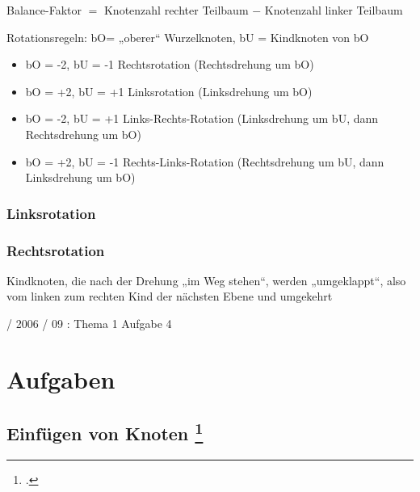 \documentclass{lehramt-informatik-haupt}
\begin{document}
\begin{center}
Balance-Faktor $=$ Knotenzahl rechter Teilbaum $-$ Knotenzahl linker Teilbaum
\end{center}

Rotationsregeln:
bO= „oberer“ Wurzelknoten, bU = Kindknoten von bO

\begin{itemize}
\item bO = -2, bU = -1  Rechtsrotation (Rechtsdrehung um bO)
\item bO = +2, bU = +1  Linksrotation (Linksdrehung um bO)
\item bO = -2, bU = +1  Links-Rechts-Rotation (Linksdrehung um bU, dann Rechtsdrehung um bO)
\item bO = +2, bU = -1  Rechts-Links-Rotation (Rechtsdrehung um bU, dann Linksdrehung um bO)
\end{itemize}

%

\subsection{Linksrotation}


%

\subsection{Rechtsrotation}


Kindknoten, die nach der Drehung „im Weg stehen“, werden „umgeklappt“,
also vom linken zum rechten Kind der nächsten Ebene und umgekehrt

 / 2006 / 09 : Thema 1 Aufgabe 4


\chapter{Aufgaben}

\section{Einfügen von Knoten
\footcite[Seite 3, Aufgabe 5: AVL-Baum]{aud:ab:7}}
\end{document}

